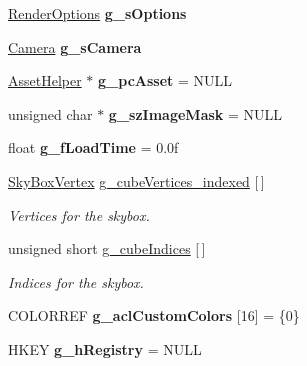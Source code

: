 \begin{DoxyCompactItemize}
\item 
\hypertarget{namespace_assimp_view_a73631f45d30cd33ccdf56c04b0655f03}{\hyperlink{class_render_options}{Render\+Options} {\bfseries g\+\_\+s\+Options}}\label{namespace_assimp_view_a73631f45d30cd33ccdf56c04b0655f03}

\item 
\hypertarget{namespace_assimp_view_a070e59a743e2501cf889dfa3d5570734}{\hyperlink{class_camera}{Camera} {\bfseries g\+\_\+s\+Camera}}\label{namespace_assimp_view_a070e59a743e2501cf889dfa3d5570734}

\item 
\hypertarget{namespace_assimp_view_aad03e9819e00e1d1a13369570a101043}{\hyperlink{class_asset_helper}{Asset\+Helper} $\ast$ {\bfseries g\+\_\+pc\+Asset} = N\+U\+L\+L}\label{namespace_assimp_view_aad03e9819e00e1d1a13369570a101043}

\item 
\hypertarget{namespace_assimp_view_a25e4ded70ea1e5a7c99481dde05305de}{unsigned char $\ast$ {\bfseries g\+\_\+sz\+Image\+Mask} = N\+U\+L\+L}\label{namespace_assimp_view_a25e4ded70ea1e5a7c99481dde05305de}

\item 
\hypertarget{namespace_assimp_view_ac5e15bee8238946f296d49fba17ebf07}{float {\bfseries g\+\_\+f\+Load\+Time} = 0.\+0f}\label{namespace_assimp_view_ac5e15bee8238946f296d49fba17ebf07}

\item 
\hyperlink{struct_assimp_view_1_1_sky_box_vertex}{Sky\+Box\+Vertex} \hyperlink{namespace_assimp_view_a0861f5fdb463a7181ac999ec09cf07d3}{g\+\_\+cube\+Vertices\+\_\+indexed} \mbox{[}$\,$\mbox{]}
\begin{DoxyCompactList}\small\item\em Vertices for the skybox. \end{DoxyCompactList}\item 
unsigned short \hyperlink{namespace_assimp_view_a11de3131b31c9e8a1371ae1f8ec30537}{g\+\_\+cube\+Indices} \mbox{[}$\,$\mbox{]}
\begin{DoxyCompactList}\small\item\em Indices for the skybox. \end{DoxyCompactList}\item 
\hypertarget{namespace_assimp_view_a198400db15e914f115fd357a8fe966c7}{C\+O\+L\+O\+R\+R\+E\+F {\bfseries g\+\_\+acl\+Custom\+Colors} \mbox{[}16\mbox{]} = \{0\}}\label{namespace_assimp_view_a198400db15e914f115fd357a8fe966c7}

\item 
\hypertarget{namespace_assimp_view_ac8c697d6793d38f52a5ac5081e65258a}{H\+K\+E\+Y {\bfseries g\+\_\+h\+Registry} = N\+U\+L\+L}\label{namespace_assimp_view_ac8c697d6793d38f52a5ac5081e65258a}


\end{DoxyCompactItemize}

